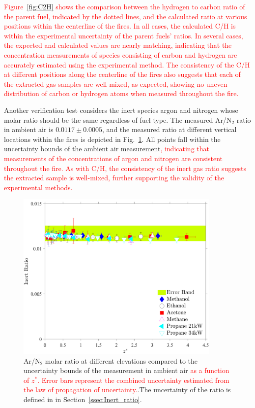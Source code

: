 \documentclass[12pt]{article}
\begin{document}
\textcolor{red}{Figure~\ref{fig:C2H} shows the comparison between the hydrogen to carbon ratio of the parent fuel, indicated by the dotted lines, and the calculated ratio at various positions within the centerline of the fires. In all cases, the calculated C/H is within the experimental uncertainty of the parent fuels' ratios. In several cases, the expected and calculated values are nearly matching, indicating that the concentration measurements of species consisting of carbon and hydrogen are accurately estimated using the experimental method. The consistency of the {C}/{H} at different positions along the centerline of the fires also suggests that each of the extracted gas samples are well-mixed, as expected, showing no uneven distribution of carbon or hydrogen atoms when measured throughout the fire.}

Another verification test considers the inert species argon and nitrogen whose molar ratio should be the same regardless of fuel type. The measured Ar/N$_2$ ratio in ambient air is $0.0117\pm0.0005$, and the measured ratio at different vertical locations within the fires is depicted in Fig.~\ref{fig:IR}. All points fall within the uncertainty bounds of the ambient air measurement\textcolor{red}{, indicating that measurements of the concentrations of argon and nitrogen are consistent throughout the fire. As with {C}/{H}, the consistency of the inert gas ratio suggests the extracted sample is well-mixed, further supporting the validity of the experimental methods.}

\begin{figure}[h!]
	\centering
\includegraphics[width=10.0cm, keepaspectratio]{Inert_ratio_Comparison.pdf}
	\caption[Ar/N$_2$ ratio within the fire envelop compared to ambient air]{Ar/N$_2$ molar ratio at different elevations compared to the uncertainty bounds of the measurement in ambient air \textcolor{red}{ as a function of $z^*$. Error bars represent the combined uncertainty estimated from the law of propagation of uncertainty.}.The uncertainty of the ratio is defined in in Section~\ref{ssec:Inert_ratio}.}
	\label{fig:IR}
\end{figure}
\clearpage
\end{document}
